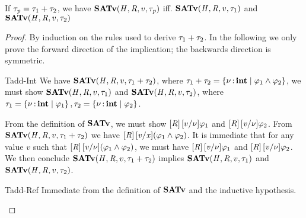 \begin{lemma} %
  \label{lem:satadd}
  If $\tau_{\mathit{p}}  =  \tau_{{\mathrm{1}}}  +  \tau_{{\mathrm{2}}}$, we have
    $ \mathbf{SATv} ( \mathit{H} , \mathit{R} , v , \tau_{\mathit{p}} ) $ iff. $ \mathbf{SATv} ( \mathit{H} , \mathit{R} , v , \tau_{{\mathrm{1}}} ) $ and $ \mathbf{SATv} ( \mathit{H} , \mathit{R} , v , \tau_{{\mathrm{2}}} ) $
\end{lemma}
\begin{proof}
  By induction on the rules used to derive $\tau_{{\mathrm{1}}}  +  \tau_{{\mathrm{2}}}$. In the following
  we only prove the forward direction of the implication; the backwards
  direction is symmetric.
  \begin{rncase}{Tadd-Int}
    We have $ \mathbf{SATv} ( \mathit{H} , \mathit{R} , v , \tau_{{\mathrm{1}}}  +  \tau_{{\mathrm{2}}} ) $, where $\tau_{{\mathrm{1}}}  +  \tau_{{\mathrm{2}}}  =   \left\{{  \nu  \operatorname{:} \mathbf{int} \mid   \varphi_{{\mathrm{1}}}  \wedge  \varphi_{{\mathrm{2}}}  }\right\} $,
    we must show $ \mathbf{SATv} ( \mathit{H} , \mathit{R} , v , \tau_{{\mathrm{1}}} ) $ and $ \mathbf{SATv} ( \mathit{H} , \mathit{R} , v , \tau_{{\mathrm{2}}} ) $,
    where $\tau_{{\mathrm{1}}}  =   \left\{{  \nu  \operatorname{:} \mathbf{int} \mid  \varphi_{{\mathrm{1}}} }\right\} , \tau_{{\mathrm{2}}}  =   \left\{{  \nu  \operatorname{:} \mathbf{int} \mid  \varphi_{{\mathrm{2}}} }\right\} $.

    From the definition of $\mathbf{SATv}$, we must show $[  \mathit{R}  ] \, [  v  /  \nu  ]  \varphi_{{\mathrm{1}}}$ and $[  \mathit{R}  ] \, [  \mathit{v}  /  \nu  ]  \varphi_{{\mathrm{2}}}$.
    From $ \mathbf{SATv} ( \mathit{H} , \mathit{R} , v , \tau_{{\mathrm{1}}}  +  \tau_{{\mathrm{2}}} ) $ we have $[  \mathit{R}  ] \, [  \mathit{v}  /  \mathit{x}  ]  (   \varphi_{{\mathrm{1}}}  \wedge  \varphi_{{\mathrm{2}}}   )$.
    It is immediate that for any value $v$ such that $[  \mathit{R}  ] \, [  \mathit{v}  /  \nu  ]  (   \varphi_{{\mathrm{1}}}  \wedge  \varphi_{{\mathrm{2}}}   )$, we must have $[  \mathit{R}  ] \, [  \mathit{v}  /  \nu  ]  \varphi_{{\mathrm{1}}}$ and $[  \mathit{R}  ] \, [  \mathit{v}  /  \nu  ]  \varphi_{{\mathrm{2}}}$.
    We then conclude $ \mathbf{SATv} ( \mathit{H} , \mathit{R} , v , \tau_{{\mathrm{1}}}  +  \tau_{{\mathrm{2}}} ) $ implies $ \mathbf{SATv} ( \mathit{H} , \mathit{R} , v , \tau_{{\mathrm{1}}} ) $ and $ \mathbf{SATv} ( \mathit{H} , \mathit{R} , v , \tau_{{\mathrm{2}}} ) $.
  \end{rncase}

  \begin{rncase}{Tadd-Ref}
    Immediate from the definition of $\mathbf{SATv}$ and the inductive hypothesis.
  \end{rncase}
\end{proof}

